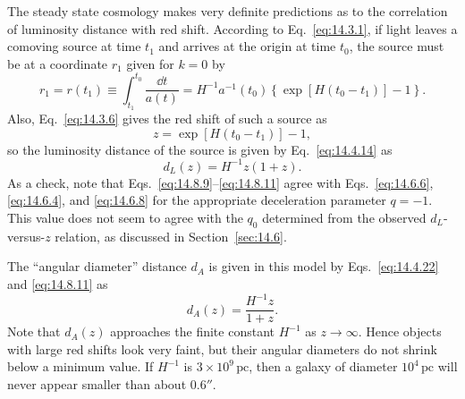 The steady state cosmology makes very definite predictions as to the
correlation of luminosity distance with red shift. According to
Eq.~\eqref{eq:14.3.1}, if light leaves a comoving source at time \(t_1\) and
arrives at the origin at time \(t_0\), the source must be at a coordinate
\(r_1\) given for \(k=0\) by
\begin{equation}
  r_1
  =
  r(t_1)
  \equiv
  \int_{t_1}^{t_0}\frac{\dd t}{a(t)}
  =
  H^{-1}a^{-1}(t_0)
  \left\{
    \exp[H(t_0-t_1)]-1
  \right\}.
  \tag{14.8.9}\label{eq:14.8.9}
\end{equation}
Also, Eq.~\eqref{eq:14.3.6} gives the red shift of such a source as
\begin{equation}
  z=\exp[H(t_0-t_1)]-1,
  \tag{14.8.10}\label{eq:14.8.10}
\end{equation}
so the luminosity distance of the source is given by
Eq.~\eqref{eq:14.4.14} as
\begin{equation}
  d_L(z)=H^{-1}z(1+z).
  \tag{14.8.11}\label{eq:14.8.11}
\end{equation}
As a check, note that Eqs.~\eqref{eq:14.8.9}--\eqref{eq:14.8.11} agree
with Eqs.~\eqref{eq:14.6.6}, \eqref{eq:14.6.4}, and
\eqref{eq:14.6.8} for the appropriate deceleration parameter \(q=-1\).
This value does not seem to agree with the \(q_0\) determined from the
observed \(d_L\)-versus-\(z\) relation, as discussed in
Section~\ref{sec:14.6}.

The ``angular diameter'' distance \(d_A\) is given in this model by
Eqs.~\eqref{eq:14.4.22} and \eqref{eq:14.8.11} as
\begin{equation}
  d_A(z)=\frac{H^{-1}z}{1+z}.
  \tag{14.8.12}\label{eq:14.8.12}
\end{equation}
Note that \(d_A(z)\) approaches the finite constant \(H^{-1}\) as
\(z\to\infty\). Hence objects with large red shifts look very faint, but
their angular diameters do not shrink below a minimum value. If \(H^{-1}\)
is \(3\times10^9\,\mathrm{pc}\), then a galaxy of diameter
\(10^4\,\mathrm{pc}\) will never appear smaller than about \(0.6''\).

